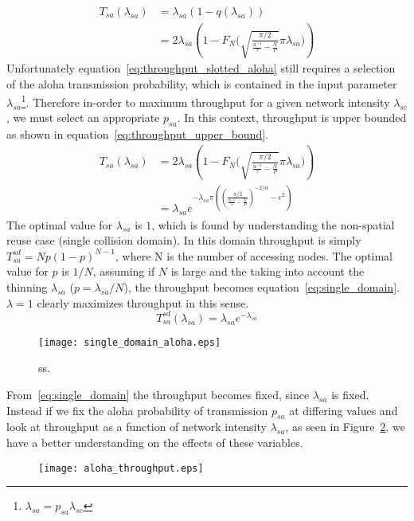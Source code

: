 %
\begin{equation}\label{eq:throughput_slotted_aloha}
	\begin{split}
		T_{sa}(\lambda_{sa}) &= \lambda_{sa}(1-q(\lambda_{sa})) \\
		&=  2\lambda_{sa}(1-F_{N}\Bigg( \sqrt{ \frac{\pi/2}{ \frac{u^{-4}}{\tau} - \frac{N}{P} } } \pi \lambda_{sa} \Bigg))
	\end{split}
\end{equation}
%
Unfortunately equation~\eqref{eq:throughput_slotted_aloha} still requires a selection of the aloha transmission probability, which is contained in the input parameter $\lambda_{sa}$\footnote{$\lambda_{sa} = p_{sa}\lambda_{sc}$}.  Therefore in-order to maximum throughput for a given network intensity $\lambda_{sc}$, we must select an appropriate $p_{sa}$.  In this context, throughput is upper bounded as shown in equation~\eqref{eq:throughput_upper_bound}.
%
\begin{equation}\label{eq:throughput_upper_bound}
	\begin{split}
	T_{sa}(\lambda_{sa}) &= 2\lambda_{sa}(1-F_{N}\Bigg( \sqrt{ \frac{\pi/2}{ \frac{u^{-4}}{\tau} - \frac{N}{P} } } \pi \lambda_{sa} \Bigg)) \\
	&= \lambda_{sa} e^{-\lambda_{sa} \pi ( (\frac{\pi/2}{ \frac{u^{-4}}{\tau} - \frac{N}{P} } )^{-2/\alpha}- \epsilon^2) }
\end{split}
\end{equation}
%
The optimal value for $\lambda_{sa}$ is $1$, which is found by understanding the non-spatial reuse case (single collision domain).  In this domain throughput is simply $T_{sa}^{sd} = Np(1-p)^{N-1}$, where N is the number of accessing nodes.  The optimal value for $p$ is $1/N$, assuming if $N$ is large and the taking into account the thinning $\lambda_{sa}$ ($p=\lambda_{sa}/N$), the throughput becomes equation~\eqref{eq:single_domain}.  $\lambda=1$ clearly maximizes throughput in this sense.
%
\begin{equation}\label{eq:single_domain}
	T_{sa}^{sd}(\lambda_{sa}) = \lambda_{sa} e^{-\lambda_{sa}}
\end{equation}
\par
%
\begin{figure}[H]\label{fig:aloha_max}
	\centering
	\texttt{[image: single\_domain\_aloha.eps]}
	\caption{ss.}
\end{figure}
%
From~\eqref{eq:single_domain} the throughput becomes fixed, since $\lambda_{sa}$ is fixed.  Instead if we fix the aloha probability of transmission $p_{sa}$ at differing values and look at throughput as a function of network intensity $\lambda_{sa}$, as seen in Figure~\ref{fig:aloha_bounds}, we have a better understanding on the effects of these variables.
%
\begin{figure}[H]\label{fig:aloha_bounds}
	\centering
	\texttt{[image: aloha\_throughput.eps]}
	\caption{}
\end{figure}
%
